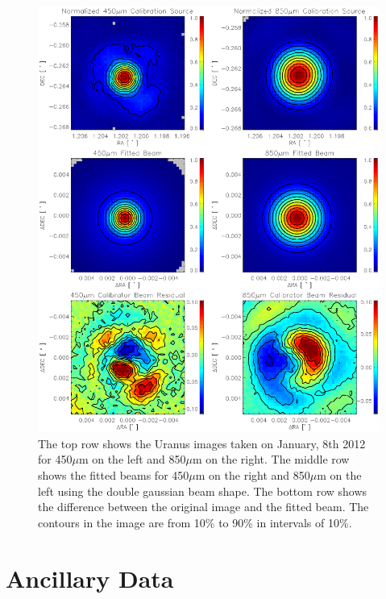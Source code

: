 \begin{figure}
  \centering
  \includegraphics[width=1.\textwidth, trim={0 5cm 0 0}]{obs_imgs/calib_beams.eps}
  \caption[SCUBA-2 Calibration and Beams]{The top row shows the Uranus images taken on January, 8th 2012 for 450$\mu$m on the left and 850$\mu$m on the right.  The middle row shows the fitted beams for 450$\mu$m on the right and 850$\mu$m on the left using the double gaussian beam shape. The bottom row shows the difference between the original image and the fitted beam.  The contours in the image are from 10\% to 90\% in intervals of 10\%.}
    \label{fig_calib}
\end{figure}

\section{Ancillary Data}\label{ancillary}

